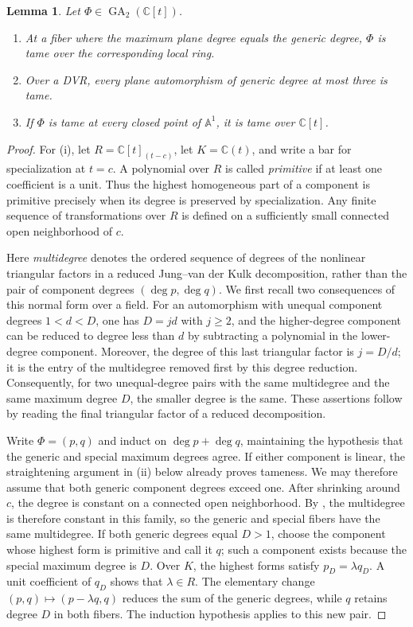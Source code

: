 \documentclass[11pt,reqno]{amsart}
\numberwithin{equation}{section}
\theoremstyle{plain}
\newtheorem{lemma}[theorem]{Lemma}
\theoremstyle{definition}
\theoremstyle{remark}
\newcommand{\C}{\mathbb C}
\newcommand{\A}{\mathbb A}
\newcommand{\GA}{\operatorname{GA}}
\begin{document}
\begin{lemma}\label{t:families}
Let $\Phi\in\GA_2(\C[t])$.
\begin{enumerate}[label=(\roman*)]
\item At a fiber where the maximum plane degree equals the generic degree,
$\Phi$ is tame over the corresponding local ring.
\item Over a DVR, every plane automorphism of generic degree at most three is tame.
\item If $\Phi$ is tame at every closed point of $\A^1$, it is tame over $\C[t]$.
\end{enumerate}
\end{lemma}
\begin{proof}
For (i), let $R=\C[t]_{(t-c)}$, let $K=\C(t)$, and write a bar
for specialization at $t=c$. A polynomial over $R$ is called
\emph{primitive} if at least one coefficient is a unit. Thus the
highest homogeneous part of a component is primitive precisely when
its degree is preserved by specialization. Any finite sequence of
transformations over $R$ is defined on a sufficiently small connected
open neighborhood of $c$.

Here \emph{multidegree} denotes the ordered sequence of degrees of the
nonlinear triangular factors in a reduced Jung--van der Kulk
decomposition, rather than the pair of component degrees
$(\deg p,\deg q)$.
We first recall two consequences of this normal form over a field.
For an automorphism with unequal component
degrees $1<d<D$, one has $D=jd$ with $j\ge2$, and the higher-degree
component can be reduced to degree less than $d$ by subtracting a
polynomial in the lower-degree component. Moreover, the degree of this
last triangular factor is $j=D/d$; it is the entry of the multidegree
removed first by this degree reduction. Consequently, for two
unequal-degree pairs with the same multidegree and the same maximum
degree $D$, the smaller degree is the same. These assertions follow
by reading the final triangular factor of a reduced decomposition.

Write $\Phi=(p,q)$ and induct on $\deg p+\deg q$, maintaining the
hypothesis that the generic and special maximum degrees agree.
If either component is linear, the straightening argument in (ii) below
already proves tameness. We may therefore assume that both generic
component degrees exceed one. After shrinking around $c$, the degree
is constant on a connected open neighborhood. By
\cite[Corollary~3]{F}, the multidegree is therefore constant in this
family, so the generic and special fibers have the same multidegree.
If both generic degrees equal $D>1$,
choose the component whose highest form is primitive and call it $q$;
such a component exists because the special maximum degree is $D$.
Over $K$, the highest forms satisfy $p_D=\lambda q_D$.
A unit coefficient of $q_D$ shows that $\lambda\in R$.
The elementary change $(p,q)\mapsto(p-\lambda q,q)$ reduces the sum
of the generic degrees, while $q$ retains degree $D$ in both fibers.
The induction hypothesis applies to this new pair.


\end{proof}
\end{document}
